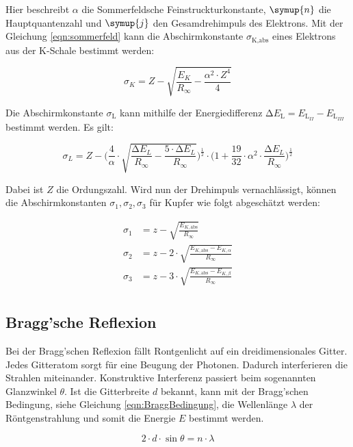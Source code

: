 Hier beschreibt $\alpha$ die Sommerfeldsche Feinstruckturkonstante, $\symup{n}$ die Hauptquantenzahl und $\symup{j}$ den Gesamdrehimpuls des Elektrons.
Mit der Gleichung \eqref{eqn:sommerfeld} kann die Abschirmkonstante $\sigma_\text{K,abs}$ eines Elektrons aus der K-Schale bestimmt werden:

\begin{equation}
    \sigma_K = Z - \sqrt{\frac{E_K}{R_\infty} - \frac{\alpha^2 \cdot Z^4}{4}}
\end{equation}

Die Abschirmkonstante $\sigma_\text{L}$ kann mithilfe der Energiedifferenz $\increment E_\text{L} = E_\text{L}_{II} -E_\text{L}_{III}$ bestimmt werden.
Es gilt:

\begin{equation}
    \sigma_L = Z -\Biggl( \frac{4}{\alpha} \cdot \sqrt{\frac{\increment E_L}{R_\infty} - \frac{5 \cdot \increment E_L}{R_\infty}} \Biggr)^{\frac{1}{2}}
                \cdot \Biggl(1 + \frac{19}{32} \cdot \alpha^2 \cdot \frac{\increment E_L}{R_\infty} \Biggr)^{\frac{1}{2}}
\end{equation}

Dabei ist $Z$ die Ordungszahl.
Wird nun der Drehimpuls vernachlässigt, können die Abschirmkonstanten $\sigma_1, \sigma_2, \sigma_3$ für Kupfer wie folgt abgeschätzt werden:

\begin{align}
    \sigma_1 &= z - \sqrt{\frac{E_{K,\text{abs}}}{R_\infty}} \label{eq:sigma1} \\
    \sigma_2 &= z - 2 \cdot \sqrt{\frac{E_{K,\text{abs}} - E_{K, \alpha}}{R_\infty}} \label{eq:sigma2} \\
    \sigma_3 &= z - 3 \cdot \sqrt{\frac{E_{K,\text{abs}} - E_{K, \beta}}{R_\infty}} \label{eq:sigma3} \\
\end{align}

\subsection{Bragg'sche Reflexion}
\label{subsec:Bragg}

Bei der Bragg'schen Reflexion fällt Rontgenlicht auf ein dreidimensionales Gitter.
Jedes Gitteratom sorgt für eine Beugung der Photonen.
Dadurch interferieren die Strahlen miteinander.
Konstruktive Interferenz passiert beim sogenannten Glanzwinkel $\theta$.
Ist die Gitterbreite $d$ bekannt, kann mit der Bragg'schen Bedingung, siehe Gleichung \eqref{eqn:BraggBedingung},
die Wellenlänge $\lambda$ der Röntgenstrahlung und somit die Energie $E$ bestimmt werden.

\begin{equation}
    \label{eqn:BraggBedingung}
    2 \cdot d \cdot \sin\theta = n \cdot \lambda
\end{equation}